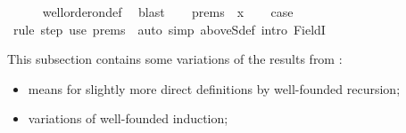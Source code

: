 \begin{isabellebody}
\ \ \ \ \isamarkupfalse%
\ well{\isacharunderscore}{\kern0pt}order{\isacharunderscore}{\kern0pt}on{\isacharunderscore}{\kern0pt}def\ \isamarkupfalse%
\ blast\isanewline
{}\isamarkupfalse%
\isanewline
\ \ \isamarkupfalse%
\ prems{\isacharcolon}{\kern0pt}\ {\isacharparenleft}{\kern0pt}{}\ x{\isacharparenright}{\kern0pt}\isanewline
\ \ \isamarkupfalse%
\ {\isacharquery}{\kern0pt}case\isanewline
\ \ \ \ \isamarkupfalse%
\ {\isacharparenleft}{\kern0pt}rule\ step{\isacharparenright}{\kern0pt}\ {\isacharparenleft}{\kern0pt}use\ prems\ \ {\isacartoucheopen}auto\ simp{\isacharcolon}{\kern0pt}\ aboveS{\isacharunderscore}{\kern0pt}def\ intro{\isacharcolon}{\kern0pt}\ FieldI{}{\isacartoucheclose}{\isacharparenright}{\kern0pt}\isanewline
{}\isamarkupfalse%
%
\endisatagproof
{\isafoldproof}%
%
\isadelimproof
%
\endisadelimproof
%
\isadelimdocument
%
\endisadelimdocument
%
\isatagdocument
%
\isamarkuptrue%
%
\endisatagdocument
{\isafolddocument}%
%
\isadelimdocument
%
\endisadelimdocument
%
\begin{isamarkuptext}%
This subsection contains some variations of the results from :

%
\begin{itemize}%
\item means for slightly more direct definitions by well-founded recursion;

\item variations of well-founded induction;


\end{itemize}
\end{isamarkuptext}
\end{isabellebody}

